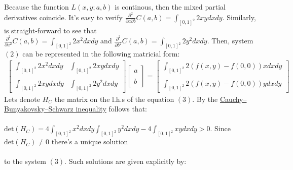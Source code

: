 \documentclass{exam}
\begin{document}
Because the function $L(x,y;a,b)$ is continous, then the mixed partial derivatives coincide. It's easy to verify $\frac{\partial^2}{\partial a \partial b} C(a,b) =  \displaystyle\int_{[0,1]^2} 2xy d x d y$. Similarly, is 
straight-forward to see that \\
$\frac{\partial^2}{\partial a^2} C(a,b) = \displaystyle\int_{[0,1]^2} 2x^2 d x d y$  and $\frac{\partial^2}{\partial b^2} C(a,b) =  \displaystyle\int_{[0,1]^2} 2y^2 d x d y$. Then, system $(2)$ can be represented in the 
following matricial form:
\begin{equation}
        \displaystyle\begin{aligned}
        \begin{bmatrix}
            \displaystyle\int_{[0,1]^2} 2x^2 d x d y & \displaystyle\int_{[0,1]^2} 2xy d x d y\\
            \\
            \displaystyle\int_{[0,1]^2} 2xy d x d y & \displaystyle\int_{[0,1]^2} 2y^2 d x d y
        \end{bmatrix} 
        \begin{bmatrix}
            a\\
            \\
            b
        \end{bmatrix} 
        =
        \begin{bmatrix}
            \displaystyle\int_{[0,1]^2} 2(f(x,y) - f(0,0)) x d x d y\\
            \\
            \displaystyle\int_{[0,1]^2} 2(f(x,y) - f(0,0)) y d x d y
        \end{bmatrix} 
    \end{aligned}
\end{equation} 
Lets denote $H_{C}$ the matrix on the l.h.s of the equation $(3)$. By the \href{https://en.wikipedia.org/wiki/Cauchy%E2%80%93Schwarz_inequality}{Cauchy–Bunyakovsky–Schwarz inequality} 
follows that:\\
\\
$\text{det}( H_{C}) = 4 \displaystyle\int_{[0,1]^2} x^2 d x d y \displaystyle\int_{[0,1]^2} y^2 d x d y  - 4 \displaystyle\int_{[0,1]^2} xy d x d y> 0$. Since $\text{det}( H_{C}) \neq 0$ there's a unique solution \\
\\
to the system $(3)$. Such solutions are given explicitly by:\\
\end{document}
